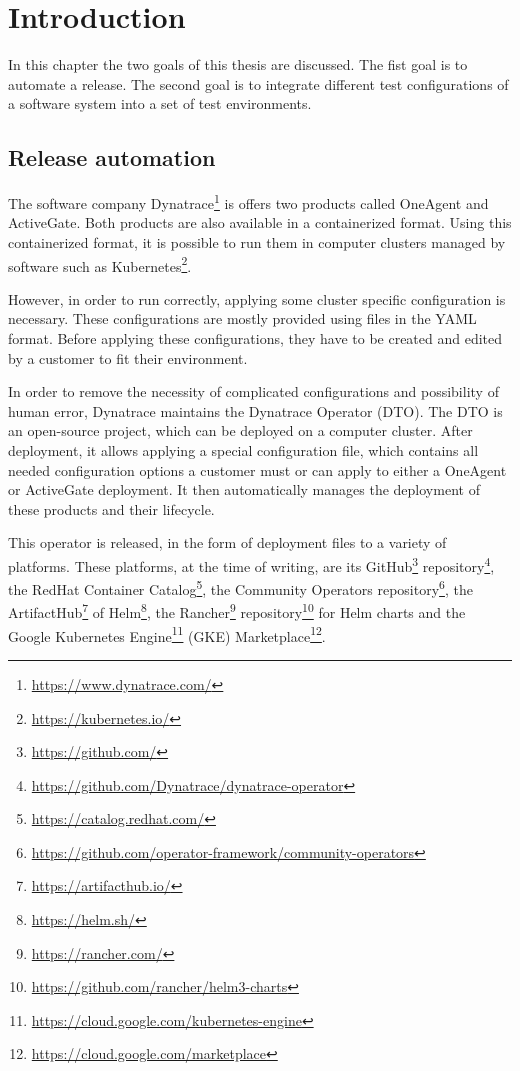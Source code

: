 \chapter{Introduction}
\label{ch:introduction}

In this chapter the two goals of this thesis are discussed.
The fist goal is to automate a release.
The second goal is to integrate different test configurations of a software system into a set of test environments.

\section{Release automation}
\label{sec:introduction:release-automation}

The software company Dynatrace\footnote{\url{https://www.dynatrace.com/}} is offers two products called OneAgent and ActiveGate.
Both products are also available in a containerized format.
Using this containerized format, it is possible to run them in computer clusters managed by software such as Kubernetes\footnote{\url{https://kubernetes.io/}}.

However, in order to run correctly, applying some cluster specific configuration is necessary.
These configurations are mostly provided using files in the YAML format\cite{UnderstandingKubernetesObjects}.
Before applying these configurations, they have to be created and edited by a customer to fit their environment.

In order to remove the necessity of complicated configurations and possibility of human error, Dynatrace maintains the Dynatrace Operator (DTO).
The DTO is an open-source project, which can be deployed on a computer cluster.
After deployment, it allows applying a special configuration file, which contains all needed configuration options a customer must or can apply to either a OneAgent or ActiveGate deployment.
It then automatically manages the deployment of these products and their lifecycle.

This operator\cite{OperatorPattern} is released, in the form of deployment files to a variety of platforms.
These platforms, at the time of writing, are
its GitHub\footnote{\url{https://github.com/}} repository\footnote{\url{https://github.com/Dynatrace/dynatrace-operator}},
the RedHat Container Catalog\footnote{\url{https://catalog.redhat.com/}},
the Community Operators repository\footnote{\url{https://github.com/operator-framework/community-operators}},
the ArtifactHub\footnote{\url{https://artifacthub.io/}} of Helm\footnote{\url{https://helm.sh/}},
the Rancher\footnote{\url{https://rancher.com/}} repository\footnote{\url{https://github.com/rancher/helm3-charts}} for Helm charts and
the Google Kubernetes Engine\footnote{\url{https://cloud.google.com/kubernetes-engine}} (GKE) Marketplace\footnote{\url{https://cloud.google.com/marketplace}}.

